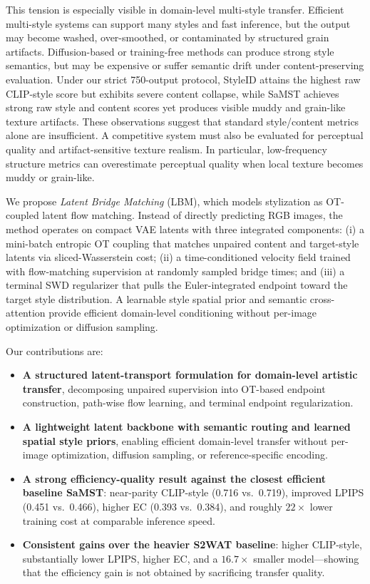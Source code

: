 ﻿\documentclass[letterpaper]{article}
\begin{document}
This tension is especially visible in domain-level multi-style transfer. Efficient multi-style systems can support many styles and fast inference, but the output may become washed, over-smoothed, or contaminated by structured grain artifacts. Diffusion-based or training-free methods can produce strong style semantics, but may be expensive or suffer semantic drift under content-preserving evaluation. Under our strict 750-output protocol, StyleID attains the highest raw CLIP-style score but exhibits severe content collapse, while SaMST achieves strong raw style and content scores yet produces visible muddy and grain-like texture artifacts. These observations suggest that standard style/content metrics alone are insufficient. A competitive system must also be evaluated for perceptual quality and artifact-sensitive texture realism. In particular, low-frequency structure metrics can overestimate perceptual quality when local texture becomes muddy or grain-like.

We propose \emph{Latent Bridge Matching} (LBM), which models stylization as OT-coupled latent flow matching. Instead of directly predicting RGB images, the method operates on compact VAE latents with three integrated components: (i) a mini-batch entropic OT coupling that matches unpaired content and target-style latents via sliced-Wasserstein cost; (ii) a time-conditioned velocity field trained with flow-matching supervision at randomly sampled bridge times; and (iii) a terminal SWD regularizer that pulls the Euler-integrated endpoint toward the target style distribution. A learnable style spatial prior and semantic cross-attention provide efficient domain-level conditioning without per-image optimization or diffusion sampling.

Our contributions are:
\begin{itemize}
    \item \textbf{A structured latent-transport formulation for domain-level artistic transfer}, decomposing unpaired supervision into OT-based endpoint construction, path-wise flow learning, and terminal endpoint regularization.
    \item \textbf{A lightweight latent backbone with semantic routing and learned spatial style priors}, enabling efficient domain-level transfer without per-image optimization, diffusion sampling, or reference-specific encoding.
    \item \textbf{A strong efficiency-quality result against the closest efficient baseline SaMST}: near-parity CLIP-style (0.716 vs.\ 0.719), improved LPIPS (0.451 vs.\ 0.466), higher EC (0.393 vs.\ 0.384), and roughly $22\times$ lower training cost at comparable inference speed.
    \item \textbf{Consistent gains over the heavier S2WAT baseline}: higher CLIP-style, substantially lower LPIPS, higher EC, and a $16.7\times$ smaller model---showing that the efficiency gain is not obtained by sacrificing transfer quality.
\end{itemize}
\end{document}
